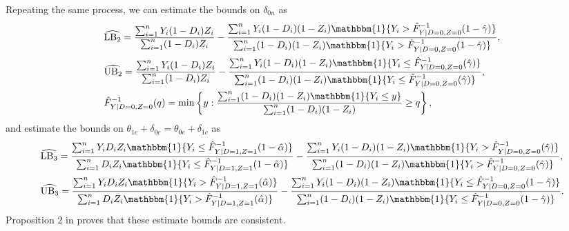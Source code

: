 \documentclass[12pt]{article}
\theoremstyle{plain}
\theoremstyle{definition}
\theoremstyle{remark}
\begin{document}
Repeating the same process, we can estimate the bounds on $\delta_{0n}$ as
\begin{equation*}
    \begin{aligned}
        & \widehat{\operatorname{LB}_2} = \frac{\sum_{i = 1}^{n} Y_i (1 - D_i) Z_i}{\sum_{i = 1}^{n} (1 - D_i) Z_i} - \frac{\sum_{i = 1}^{n} Y_i (1 - D_i) (1 - Z_i) \mathbbm{1} \{Y_i > \hat{F}^{-1}_{Y \mid D = 0, Z = 0}(1 - \hat{\gamma})\}}{\sum_{i = 1}^{n} (1 - D_i) (1 - Z_i) \mathbbm{1} \{Y_i > \hat{F}^{-1}_{Y \mid D = 0, Z = 0}(1 - \hat{\gamma})\}}, \\
        & \widehat{\operatorname{UB}_2} = \frac{\sum_{i = 1}^{n} Y_i (1 - D_i) Z_i}{\sum_{i = 1}^{n} (1 - D_i) Z_i} - \frac{\sum_{i = 1}^{n} Y_i (1 - D_i) (1 - Z_i) \mathbbm{1} \{Y_i \leq \hat{F}^{-1}_{Y \mid D = 0, Z = 0}(\hat{\gamma})\}}{\sum_{i = 1}^{n} (1 - D_i) (1 - Z_i) \mathbbm{1} \{Y_i \leq \hat{F}^{-1}_{Y \mid D = 0, Z = 0}(\hat{\gamma})\}}, \\
        & \hat{F}^{-1}_{Y \mid D = 0, Z = 0}(q) = \min \left\{y: \frac{\sum_{i = 1}^{n} (1 - D_i) (1 - Z_i) \mathbbm{1}\{Y_i \leq y\}}{\sum_{i = 1}^{n} (1 - D_i) (1 - Z_i)} \geq q\right\},
    \end{aligned}
\end{equation*}
and estimate the bounds on $\theta_{1c}+\delta_{0c}=\theta_{0c}+\delta_{1c}$ as
\begin{equation*}
    \begin{aligned}
        & \widehat{\operatorname{LB}_3} = \frac{\sum_{i = 1}^{n} Y_i D_i Z_i \mathbbm{1} \{Y_i \leq \hat{F}^{-1}_{Y \mid D = 1, Z = 1}(1 - \hat{\alpha})\}}{\sum_{i = 1}^{n} D_i Z_i \mathbbm{1} \{Y_i \leq \hat{F}^{-1}_{Y \mid D = 1, Z = 1}(1 - \hat{\alpha})\}} - \frac{\sum_{i = 1}^{n} Y_i (1 - D_i) (1 - Z_i) \mathbbm{1} \{Y_i > \hat{F}^{-1}_{Y \mid D = 0, Z = 0}(\hat{\gamma})\}}{\sum_{i = 1}^{n} (1 - D_i) (1 - Z_i) \mathbbm{1} \{Y_i > \hat{F}^{-1}_{Y \mid D = 0, Z = 0}(\hat{\gamma})\}}, \\
        & \widehat{\operatorname{UB}_3} = \frac{\sum_{i = 1}^{n} Y_i D_i Z_i \mathbbm{1} \{Y_i > \hat{F}^{-1}_{Y \mid D = 1, Z = 1}(\hat{\alpha})\}}{\sum_{i = 1}^{n} D_i Z_i \mathbbm{1} \{Y_i > \hat{F}^{-1}_{Y \mid D = 1, Z = 1}(\hat{\alpha})\}} - \frac{\sum_{i = 1}^{n} Y_i (1 - D_i) (1 - Z_i) \mathbbm{1} \{Y_i \leq \hat{F}^{-1}_{Y \mid D = 0, Z = 0}(1 - \hat{\gamma})\}}{\sum_{i = 1}^{n} (1 - D_i) (1 - Z_i) \mathbbm{1} \{Y_i \leq \hat{F}^{-1}_{Y \mid D = 0, Z = 0}(1 - \hat{\gamma})\}}.
    \end{aligned}
\end{equation*}
Proposition 2 in \cite{Lee2009TrainingEffects} proves that these estimate bounds are consistent.
\end{document}
